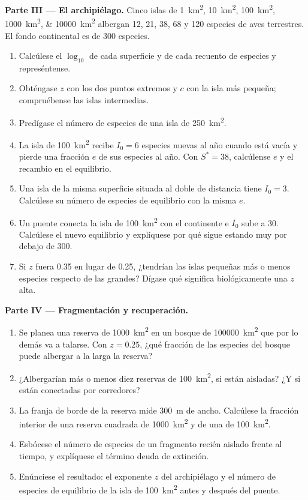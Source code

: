 \begin{problem}
\medskip
\noindent\textbf{Parte III --- El archipiélago.}
Cinco islas de \qtylist{1;10;100;1000;10000}{km^2} albergan \num{12}, \num{21}, \num{38}, \num{68} y
\num{120} especies de aves terrestres. El fondo continental es de \num{300}
especies.
\begin{enumerate}[resume]
  \item Calcúlese el $\log_{10}$ de cada superficie y de cada recuento de
        especies y represéntense.
  \item Obténgase $z$ con los dos puntos extremos y $c$ con la isla más
        pequeña; compruébense las islas intermedias.
  \item Predígase el número de especies de una isla de \qty{250}{km^2}.
  \item La isla de \qty{100}{km^2} recibe $I_0 = 6$ especies nuevas al año
        cuando está vacía y pierde una fracción $e$ de sus especies al año.
        Con $S^* = 38$, calcúlense $e$ y el recambio en el equilibrio.
  \item Una isla de la misma superficie situada al doble de distancia tiene
        $I_0 = 3$. Calcúlese su número de especies de equilibrio con la
        misma $e$.
  \item Un puente conecta la isla de \qty{100}{km^2} con el continente e
        $I_0$ sube a \num{30}. Calcúlese el nuevo equilibrio y explíquese
        por qué sigue estando muy por debajo de \num{300}.
  \item Si $z$ fuera \num{0.35} en lugar de \num{0.25}, ¿tendrían las islas
        pequeñas más o menos especies respecto de las grandes? Dígase qué
        significa biológicamente una $z$ alta.
\end{enumerate}

\medskip
\noindent\textbf{Parte IV --- Fragmentación y recuperación.}
\begin{enumerate}[resume]
  \item Se planea una reserva de \qty{1000}{km^2} en un bosque de
        \qty{100000}{km^2} que por lo demás va a talarse. Con $z =
        0.25$, ¿qué fracción de las especies del bosque puede albergar a la
        larga la reserva?
  \item ¿Albergarían más o menos diez reservas de \qty{100}{km^2}, si están
        aisladas? ¿Y si están conectadas por corredores?
  \item La franja de borde de la reserva mide \qty{300}{m} de ancho.
        Calcúlese la fracción interior de una reserva cuadrada de
        \qty{1000}{km^2} y de una de \qty{100}{km^2}.
  \item Esbócese el número de especies de un fragmento recién aislado frente
        al tiempo, y explíquese el término deuda de extinción.
  \item Enúnciese el resultado: el exponente $z$ del archipiélago y el
        número de especies de equilibrio de la isla de \qty{100}{km^2}
        antes y después del puente.
\end{enumerate}
\end{problem}
